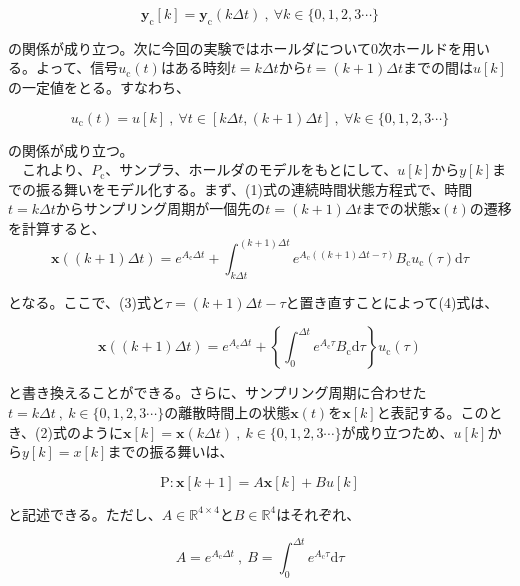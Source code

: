 \documentclass[a4paper,10.5pt]{ltjsarticle}
\begin{document}
\begin{equation}
  \bm y_\mathrm{c}[k]=\bm y_\mathrm{c}(k\Delta t)\ ,\ \forall k\in\{0,1,2,3\cdots\}
\end{equation}

の関係が成り立つ。次に今回の実験ではホールダについて0次ホールドを用いる。よって、信号$u_\mathrm{c}(t)$はある時刻$t=k\Delta t$から$t=(k+1)\Delta t$までの間は$u[k]$の一定値をとる。すなわち、

\begin{equation}
  u_\mathrm{c}(t)=u[k]\ ,\ \forall t\in[k\Delta t,(k+1)\Delta t]\ ,\ \forall k\in\{0,1,2,3\cdots\}
\end{equation}

の関係が成り立つ。\\
　これより、$P_\mathrm{c}$、サンプラ、ホールダのモデルをもとにして、$u[k]$から$y[k]$までの振る舞いをモデル化する。まず、(1)式の連続時間状態方程式で、時間$t=k\Delta t$からサンプリング周期が一個先の$t=(k+1)\Delta t$までの状態$\bm x(t)$の遷移を計算すると、
\begin{equation}
  \bm x((k+1)\Delta t)=e^{A_\mathrm{c}\Delta t}+\int_{k\Delta t}^{(k+1)\Delta t} e^{A_\mathrm{c}((k+1)\Delta t-\tau)}B_\mathrm{c}u_\mathrm{c}(\tau)\mathrm{d}\tau
\end{equation}

となる。ここで、(3)式と$\tau=(k+1)\Delta t-\tau$と置き直すことによって(4)式は、

\begin{equation}
  \bm x((k+1)\Delta t)=e^{A_\mathrm{c}\Delta t}+\left\{\int_{0}^{\Delta t} e^{A_\mathrm{c}\tau}B_\mathrm{c}\mathrm{d}\tau\right\}u_\mathrm{c}(\tau)
\end{equation}

と書き換えることができる。さらに、サンプリング周期に合わせた$t=k\Delta t\ ,\ k\in\{0,1,2,3\cdots\}$の離散時間上の状態$\bm x(t)$を$\bm x[k]$と表記する。このとき、(2)式のように$\bm x[k]=\bm x(k\Delta t)\ ,\ k\in \{0,1,2,3\cdots\}$が成り立つため、$u[k]$から$y[k]=x[k]$までの振る舞いは、

\begin{equation}
  \mathrm{P}:\bm x[k+1]=A\bm x[k]+Bu[k]
\end{equation}

と記述できる。ただし、$A\in \mathbb{R}^{4\times4}$と$B\in \mathbb{R}^{4}$はそれぞれ、

\begin{equation}
  A=e^{A_\mathrm{c}\Delta t}\ ,\ B=\int_{0}^{\Delta t}e^{A_\mathrm{c}\tau}\mathrm{d}\tau
\end{equation}
\end{document}
